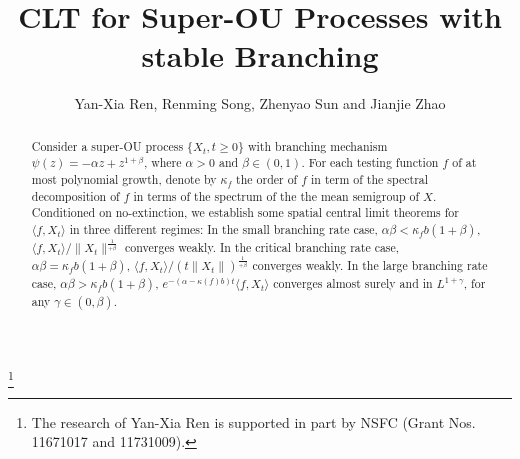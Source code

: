 \documentclass[12pt]{amsart}
\theoremstyle{plain}
\theoremstyle{definition}
\numberwithin{equation}{section}
\begin{document}
\title
    [CLT for Super-OU processes]
    {CLT for Super-OU Processes with stable Branching}
\author
    [Y.-X. Ren, R. Song, Z. Sun and J. Zhao]
    {Yan-Xia Ren, Renming Song, Zhenyao Sun and Jianjie Zhao}
\address
    {Yan-Xia Ren\\
    School of Mathematical Sciences\\
    Peking University\\
    Beijing, P. R. China, 100871}
\thanks{The research of Yan-Xia Ren is supported in part by NSFC (Grant Nos. 11671017  and 11731009).}
\address
    {Zhenyao Sun\\
    School of Mathematical Sciences\\
    Peking University\\
    Beijing, P. R. China, 100871}
\address
    {Jianjie Zhao\\
    School of Mathematical Sciences\\
    Peking University\\
    Beijing, P. R. China, 100871}
\begin{abstract}
    Consider a super-OU process $\{X_t, t\geq 0\}$ with branching mechanism $\psi(z)=-\alpha z +z^{1+\beta}$, where $\alpha >0$ and $\beta\in (0,1)$. For each testing function $f$ of at most polynomial growth,
    denote by $\kappa_f$ the order of $f$ in term of the spectral decomposition of $f$ in terms of the spectrum of the the mean semigroup of $X$. 
    Conditioned on no-extinction, we establish some spatial central limit theorems for $\langle f, X_t \rangle$ in three different regimes: In the small branching rate case, $\alpha\beta< \kappa_f b(1+\beta)$, $\langle f,X_t\rangle/\|X_t\|^{\frac{1}{+\beta}}$ converges weakly.
    In the critical branching rate case, $\alpha\beta= \kappa_f b(1+\beta)$,  $\langle f,X_t\rangle/(t\|X_t\|)^{\frac{1}{+\beta}}$ converges weakly.
    In the large branching rate case,  $\alpha\beta> \kappa_f b(1+\beta)$, $e^{-(\alpha-\kappa(f)b)t}\langle f,X_t\rangle$ converges almost surely and in $L^{1+\gamma}$, for any $\gamma \in (0,\beta)$.
\end{abstract}
\maketitle
\end{document}
